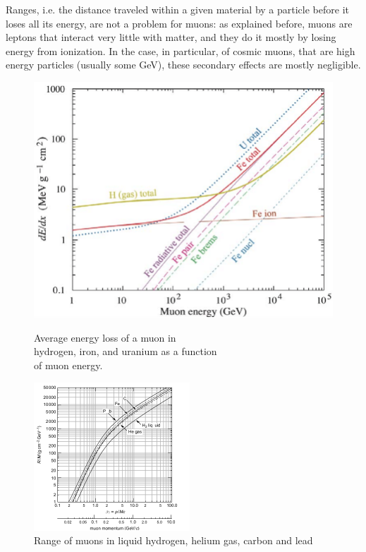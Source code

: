 \documentclass[a4paper,11pt]{book}
\begin{document}
Ranges, i.e. the distance traveled within a given material by a particle before it loses all its energy, are not a problem for muons: as explained before, muons are leptons that interact very little with matter, and they do it mostly by losing energy from ionization. In the case, in particular, of cosmic muons, that are high energy particles (usually some GeV), these secondary effects are mostly negligible.\\

\begin{figure}[hbtp]
\begin{minipage}[c]{0.5\textwidth}
\centering
\includegraphics{pictures/muon_energy_loss.pdf}
\caption{Average energy loss of a muon in \\hydrogen, iron, and uranium as a function \\of muon energy.}
\label{fig:muon_energy_loss}
\end{minipage}  \hfill
\begin{minipage}[c]{0.5\textwidth}
\centering
\includegraphics[scale=1.8]{pictures/muon_range.pdf}
\caption{Range of muons in liquid hydrogen, helium gas, carbon and lead}
\label{fig:muon_range}
\end{minipage}
\end{figure}
\end{document}
